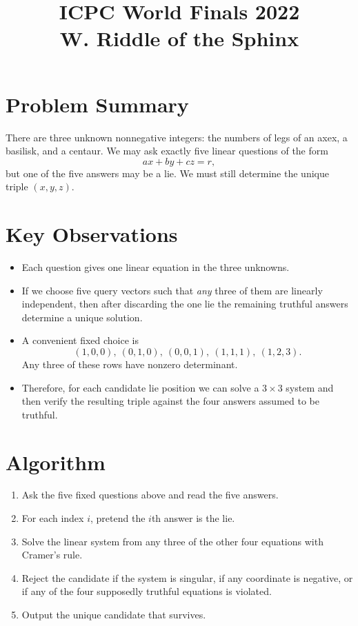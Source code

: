 \documentclass[11pt]{article}
\title{ICPC World Finals 2022\\W. Riddle of the Sphinx}
\author{}
\date{}
\begin{document}
\maketitle

\section*{Problem Summary}

There are three unknown nonnegative integers: the numbers of legs of an axex, a basilisk, and a
centaur. We may ask exactly five linear questions of the form
\[
ax + by + cz = r,
\]
but one of the five answers may be a lie. We must still determine the unique triple $(x,y,z)$.

\section*{Key Observations}

\begin{itemize}[leftmargin=*]
    \item Each question gives one linear equation in the three unknowns.
    \item If we choose five query vectors such that \emph{any} three of them are linearly independent, then
    after discarding the one lie the remaining truthful answers determine a unique solution.
    \item A convenient fixed choice is
    \[
    (1,0,0),\ (0,1,0),\ (0,0,1),\ (1,1,1),\ (1,2,3).
    \]
    Any three of these rows have nonzero determinant.
    \item Therefore, for each candidate lie position we can solve a $3 \times 3$ system and then verify the
    resulting triple against the four answers assumed to be truthful.
\end{itemize}

\section*{Algorithm}

\begin{enumerate}[leftmargin=*]
    \item Ask the five fixed questions above and read the five answers.
    \item For each index $i$, pretend the $i$th answer is the lie.
    \item Solve the linear system from any three of the other four equations with Cramer's rule.
    \item Reject the candidate if the system is singular, if any coordinate is negative, or if any of the four
    supposedly truthful equations is violated.
    \item Output the unique candidate that survives.
\end{enumerate}
\end{document}

